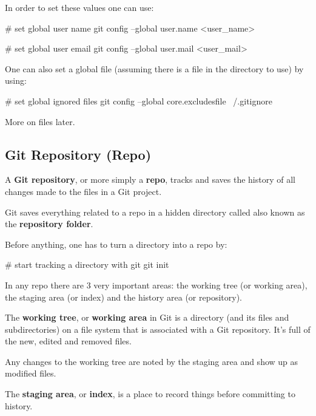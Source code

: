In order to set these values one can use:

\begin{bash}
# set global user name
git config --global user.name <user_name>
\end{bash}

\begin{bash}
# set global user email
git config --global user.mail <user_mail>
\end{bash}

One can also set a global  file (assuming there is a  file in the directory to use)
by using:

\begin{bash}
# set global ignored files
git config --global core.excludesfile ~/.gitignore
\end{bash}

More on  files later.

\subsection{Git Repository (Repo)}

A \textbf{Git repository}, or more simply a \textbf{repo}, tracks and saves the history of all changes made to the
files in a Git project.
\ed

Git saves everything related to a repo in a hidden directory called  also known as the \textbf{repository
folder}.
\ed

Before anything, one has to turn a directory into a repo by:

\begin{bash}
# start tracking a directory with git
git init
\end{bash}

In any repo there are 3 very important areas: the working tree (or working area), the staging area (or index) and the
history area (or repository).

The \textbf{working tree}, or \textbf{working area} in Git is a directory (and its files and subdirectories) on a
file system that is associated with a Git repository. It’s full of the new, edited and removed files.
\ed

Any changes to the working tree are noted by the staging area and show up as modified files.

The \textbf{staging area}, or \textbf{index}, is a place to record things before committing to history.
\ed

